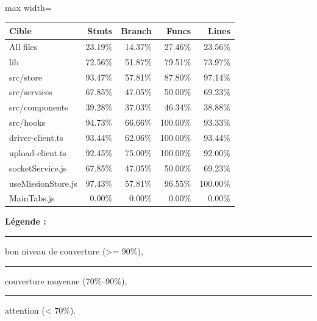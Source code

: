 \vspace{1em}
\begin{center}
\scriptsize
\begin{adjustbox}{max width=\textwidth}
\begin{tabular}{l r r r r}
\hline
\textbf{Cible} & \textbf{Stmts} & \textbf{Branch} & \textbf{Funcs} & \textbf{Lines} \\
\hline
All files & \cellcolor{corpored!30}23.19\% & \cellcolor{corpored!30}14.37\% & \cellcolor{corpored!30}27.46\% & \cellcolor{corpored!30}23.56\% \\
lib & \cellcolor{corpoyellow!30}72.56\% & \cellcolor{corpoyellow!30}51.87\% & \cellcolor{corpoyellow!30}79.51\% & \cellcolor{corpoyellow!30}73.97\% \\
src/store & \cellcolor{corpogreen!30}93.47\% & \cellcolor{corpoyellow!30}57.81\% & \cellcolor{corpoyellow!30}87.80\% & \cellcolor{corpogreen!30}97.14\% \\
src/services & \cellcolor{corpored!30}67.85\% & \cellcolor{corpored!30}47.05\% & \cellcolor{corpored!30}50.00\% & \cellcolor{corpored!30}69.23\% \\
src/components & \cellcolor{corpored!30}39.28\% & \cellcolor{corpored!30}37.03\% & \cellcolor{corpored!30}46.34\% & \cellcolor{corpored!30}38.88\% \\
src/hooks & \cellcolor{corpogreen!30}94.73\% & \cellcolor{corpoyellow!30}66.66\% & \cellcolor{corpogreen!30}100.00\% & \cellcolor{corpogreen!30}93.33\% \\
driver-client.ts & \cellcolor{corpogreen!30}93.44\% & \cellcolor{corpoyellow!30}62.06\% & \cellcolor{corpogreen!30}100.00\% & \cellcolor{corpogreen!30}93.44\% \\
upload-client.ts & \cellcolor{corpogreen!30}92.45\% & \cellcolor{corpoyellow!30}75.00\% & \cellcolor{corpogreen!30}100.00\% & \cellcolor{corpogreen!30}92.00\% \\
socketService.js & \cellcolor{corpored!30}67.85\% & \cellcolor{corpored!30}47.05\% & \cellcolor{corpored!30}50.00\% & \cellcolor{corpored!30}69.23\% \\
useMissionStore.js & \cellcolor{corpogreen!30}97.43\% & \cellcolor{corpoyellow!30}57.81\% & \cellcolor{corpogreen!30}96.55\% & \cellcolor{corpogreen!30}100.00\% \\
MainTabs.js & \cellcolor{corpored!30}0.00\% & \cellcolor{corpored!30}0.00\% & \cellcolor{corpored!30}0.00\% & \cellcolor{corpored!30}0.00\% \\
\hline
\end{tabular}
\end{adjustbox}
\end{center}
\normalsize

\vspace{0.5em}
\noindent \textbf{Légende :} \textcolor{corpogreen}{\rule{1em}{1em}} \quad bon niveau de couverture (>= 90\%), \quad \textcolor{corpoyellow}{\rule{1em}{1em}} \quad couverture moyenne (70\%--90\%), \quad \textcolor{corpored}{\rule{1em}{1em}} \quad attention (< 70\%).

